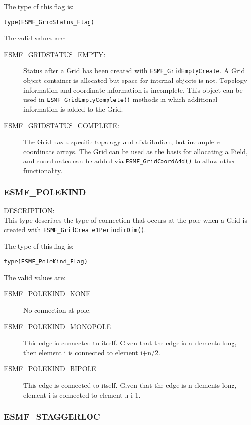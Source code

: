 The type of this flag is:

{\tt type(ESMF\_GridStatus\_Flag)}

The valid values are:
\begin{description}
\item [ESMF\_GRIDSTATUS\_EMPTY:] Status after a Grid has been created with 
      {\tt ESMF\_GridEmptyCreate}.  A Grid object container is allocated but
      space for internal objects is not.  Topology information and coordinate
      information is incomplete.  This object can be used in {\tt ESMF\_GridEmptyComplete()}
      methods in which additional information is added to the Grid.
\item [ESMF\_GRIDSTATUS\_COMPLETE:] The Grid has a specific topology and
      distribution, but incomplete coordinate arrays.  The Grid can be used
      as the basis for allocating a Field, and coordinates can be added
      via {\tt ESMF\_GridCoordAdd()} to allow other functionality. 
\end{description}


\subsubsection{ESMF\_POLEKIND}
\label{const:polekind}

{\sf DESCRIPTION:\\}
This type describes the type of connection that occurs at the pole when a Grid is 
created with {\tt ESMF\_GridCreate1PeriodicDim()}.

The type of this flag is:

{\tt type(ESMF\_PoleKind\_Flag)}

The valid values are:
\begin{description}
\item [ESMF\_POLEKIND\_NONE] No connection at pole.

\item [ESMF\_POLEKIND\_MONOPOLE] This edge is connected to itself. Given
that the edge is n elements long, then element i is connected to
element i+n/2.

\item [ESMF\_POLEKIND\_BIPOLE] This edge is connected to itself. Given
that the edge is n elements long, element i is connected to element n-i-1.
\end{description}


\subsubsection{ESMF\_STAGGERLOC}
\label{const:staggerloc}

